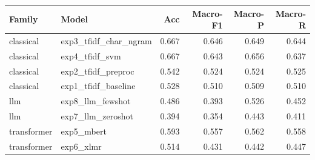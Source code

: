 \begin{tabular}{llrrrr}
\toprule
Family & Model & Acc & Macro-F1 & Macro-P & Macro-R \\
\midrule
classical & exp3_tfidf_char_ngram & 0.667 & 0.646 & 0.649 & 0.644 \\
classical & exp4_tfidf_svm & 0.667 & 0.643 & 0.656 & 0.637 \\
classical & exp2_tfidf_preproc & 0.542 & 0.524 & 0.524 & 0.525 \\
classical & exp1_tfidf_baseline & 0.528 & 0.510 & 0.509 & 0.510 \\
llm & exp8_llm_fewshot & 0.486 & 0.393 & 0.526 & 0.452 \\
llm & exp7_llm_zeroshot & 0.394 & 0.354 & 0.443 & 0.411 \\
transformer & exp5_mbert & 0.593 & 0.557 & 0.562 & 0.558 \\
transformer & exp6_xlmr & 0.514 & 0.431 & 0.442 & 0.447 \\
\bottomrule
\end{tabular}